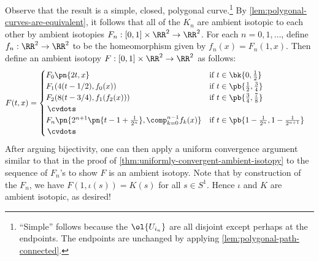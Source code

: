 \begin{sproof}
  Observe that the result is a simple, closed, polygonal
  curve.\footnote{``Simple'' follows because the $\ol{U_{i_n}}$ are
    all disjoint except perhaps at the endpoints. The endpoints are
    unchanged by applying \cref{lem:polygonal-path-connected}.} By
  \cref{lem:polygonal-curves-are-equivalent}, it follows that all of
  the $K_n$ are ambient isotopic to each other by ambient isotopies
  $F_n : [0,1] \times \RR^2 \to \RR^2$. For each $n= 0,1,\ldots$,
  define $f_n : \RR^2 \to \RR^2$ to be the homeomorphism given by
  $f_n(x) = F_n(1, x)$. Then define an ambient isotopy $F : [0,1]
  \times \RR^2 \to \RR^2$ as follows:
  \begin{align*}
    F(t, x)
    &=
      \begin{cases}
        F_0\pn{2t, x} & \text{if } t \in \bk{0, \frac{1}{2}} \\
        F_1(4(t - 1/2), f_0(x)) & \text{if } t \in \pb{\frac{1}{2},
          \frac{3}{4}} \\
        F_2(8(t - 3/4), f_1(f_2(x))) & \text{if } t \in
        \pb{\frac{3}{4}, \frac{7}{8}} \\
        \,\cvdots & \\
        F_n\pn{2^{n+1}\pn{t - 1 + \frac{1}{2^n}}, \comp_{k=0}^{n-1}
          f_k(x)} & \text{if } t \in \pb{1 - \frac{1}{2^n}, 1 -
          \frac{1}{2^{n+1}}} \\
        \,\cvdots &
      \end{cases}
  \end{align*}
  After arguing bijectivity, one can then apply a uniform convergence
  argument similar to that in the proof of
  \cref{thm:uniformly-convergent-ambient-isotopy} to the sequence of
  $F_n$'s to show%
  $F$ is an ambient isotopy. Note that by construction of the $F_n$,
  we have $F(1, \iota(s)) = K(s)$ for all $s \in S^1$. Hence $\iota$
  and $K$ are ambient isotopic, as desired!

\end{sproof}
